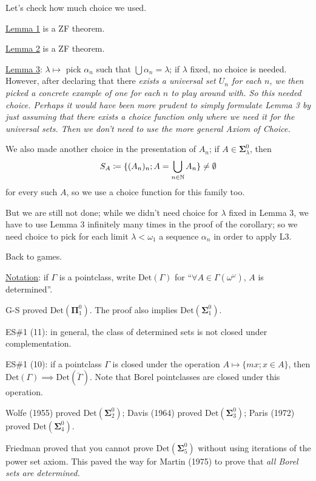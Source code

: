 \documentclass[]{article}
\newcommand{\om}{\omega}
\newcommand{\bosig}{\bm{\Sigma}}
\newcommand{\bopi}{\bm{\Pi}}
\newcommand{\bg}{{\breve \Gamma}}
\newcommand{\Det}{\textrm{Det}}
\begin{document}
\begin{remark*}
    Let's check how much choice we used.

    \underline{Lemma 1} is a ZF theorem.

    \underline{Lemma 2} is a ZF theorem.

    \underline{Lemma 3}: $\lambda \mapsto $ pick $\alpha_n$ such that $\bigcup \alpha_n = \lambda$; if $\lambda$ fixed, no choice is needed. However, after declaring that there \it{exists} a universal set $U_n$ for each $n$, we then picked a concrete example of one for each $n$ to play around with. So this needed choice. Perhaps it would have been more prudent to simply formulate Lemma 3 by just assuming that there exists a choice function \it{only where we need it} for the universal sets. Then we don't need to use the more general Axiom of Choice.

    We also made another choice in the presentation of $A_n$; if $A \in \bosig_\lambda^0$, then $$S_A\coloneqq \{(A_n)_n; A = \bigcup_{n\in\mathbb{N}}A_n\}\ne\emptyset$$ for every such $A$, so we use a choice function for this family too.

    But we are still not done; while we didn't need choice for $\lambda$ fixed in Lemma 3, we have to use Lemma 3 infinitely many times in the proof of the corollary; so we need choice to pick for each limit $\lambda < \om_1$ a sequence $\alpha_n$ in order to apply L3.
\end{remark*}

Back to games.

\underline{Notation}: if $\Gamma$ is a pointclass, write $\Det(\Gamma)$ for ``$\forall A \in \Gamma(\om^\om)$, $A$ is determined''.

G-S proved $\Det(\bopi_1^0)$. The proof also implies $\Det(\bosig_1^0)$.

ES\#1 (11): in general, the class of determined sets is not closed under complementation.

ES\#1 (10): if a pointclass $\Gamma$ is closed under the operation $A\mapsto \{mx;x\in A\}$, then $\Det(\Gamma) \implies \Det(\bg)$. Note that Borel pointclasses are closed under this operation.

Wolfe (1955) proved $\Det(\bosig_2^0)$; Davis (1964) proved $\Det(\bosig_3^0)$; Paris (1972) proved $\Det(\bosig_4^0)$.

Friedman proved that you cannot prove $\Det(\bosig_5^0)$ without using iterations of the power set axiom. This paved the way for Martin (1975) to prove that \it{all} Borel sets are determined.
\end{document}
